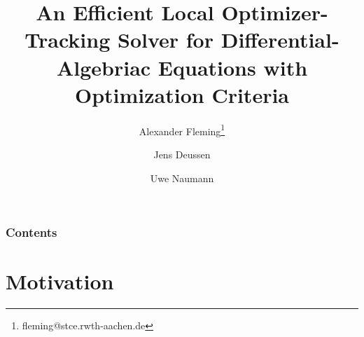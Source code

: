 \documentclass[ucs,10pt]{beamer}
\begin{document}
\title[AD2024, Chicago, Sep 16-19, 2024]{{\bf An Efficient Local Optimizer-Tracking Solver for Differential-Algebriac Equations with Optimization Criteria}}
\author[]{Alexander Fleming\footnote{\scriptsize fleming@stce.rwth-aachen.de} \and Jens Deussen \and Uwe Naumann}
		
\begin{frame}[plain]
\titlepage
\end{frame}

\begin{frame}
	\frametitle{Contents}
\tableofcontents
\end{frame}

\section{Motivation}
\end{document}
